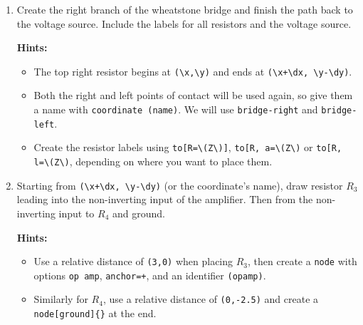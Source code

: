 \begin{enumerate}
\begin{enumerate}
        \textbf{Hints:} \begin{itemize}
            \item Create the voltage source using \verb|to[sV]| starting at \verb|(0,0)| and ending at \verb|(0,\y)|.
            \item The top left resistor starts at \verb|(\x,\y)| and ends at \verb|(\x-\dx,\y-\dy)|.
            \item The option \verb|*-*| places the ``connection dots'' at each extremity of a path; similarly, you can use \verb|*-| or \verb|-*| for only one extremity.
        \end{itemize}
            
        \item Create the right branch of the wheatstone bridge and finish the path back to the voltage source. Include the labels for all resistors and the voltage source.
        
        \textbf{Hints:}
        \begin{itemize}
            \item The top right resistor begins at \verb|(\x,\y)| and ends at \verb|(\x+\dx, \y-\dy)|.
            \item Both the right and left points of contact will be used again, so give them a name with \texttt{coordinate (name)}. We will use \texttt{bridge-right} and \texttt{bridge-left}.
            \item Create the resistor labels using \verb|to[R=\(Z\)]|, \verb|to[R, a=\(Z\)| or \verb|to[R, l=\(Z\)|, depending on where you want to place them.
        \end{itemize}

        \item Starting from \verb|(\x+\dx, \y-\dy)| (or the coordinate's name), draw resistor \( R_3 \) leading into the non-inverting input of the amplifier. Then from the non-inverting input to \( R_4 \) and ground.
        
        \textbf{Hints:} \begin{itemize}
            \item Use a relative distance of \verb|(3,0)| when placing \( R_3 \), then create a \texttt{node} with options \verb|op amp|, \verb|anchor=+|, and an identifier \verb|(opamp)|.
            \item Similarly for \( R_4 \), use a relative distance of \verb|(0,-2.5)| and create a \verb|node[ground]{}| at the end.
        \end{itemize}


\end{enumerate}
\end{enumerate}
